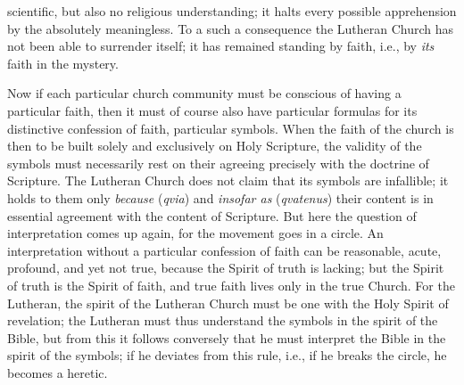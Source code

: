 \documentclass[12pt,a4paper]{article}
\newcommand{\opage}[1]{\marginnote{\footnotesize\textit{[#1]}}}
\begin{document}
scientific, but also no religious understanding; it halts
every possible apprehension by the absolutely meaningless. To a
\opage{22}such a consequence the Lutheran Church has not been able to surrender
itself; it has remained standing by faith, i.e., by \emph{its} faith in the
mystery.

Now if each particular church community must be conscious of having a
particular faith, then it must of course also have particular formulas for
its distinctive confession of faith, particular symbols. When the faith of
the church is then to be built solely and exclusively on Holy Scripture, the
validity of the symbols must necessarily rest on their agreeing precisely
with the doctrine of Scripture. The Lutheran Church does not claim that its
symbols are infallible; it holds to them only \emph{because} (\textit{qvia})
and \emph{insofar as} (\textit{qvatenus}) their content is in essential
agreement with the content of Scripture. But here the question of
interpretation comes up again, for the movement goes in a circle. An
interpretation without a particular confession of faith can be reasonable,
acute, profound, and yet not true, because the Spirit of truth is lacking;
but the Spirit of truth is the Spirit of faith, and true faith lives only in
the true Church. For the Lutheran, the spirit of the Lutheran Church must be
one with the Holy Spirit of revelation; the Lutheran must thus understand
the symbols in the spirit of the Bible, but from this it follows conversely
that he must interpret the Bible in the spirit of the symbols; if he
deviates from this rule, i.e., if he breaks the circle, he becomes a
heretic.
\end{document}
